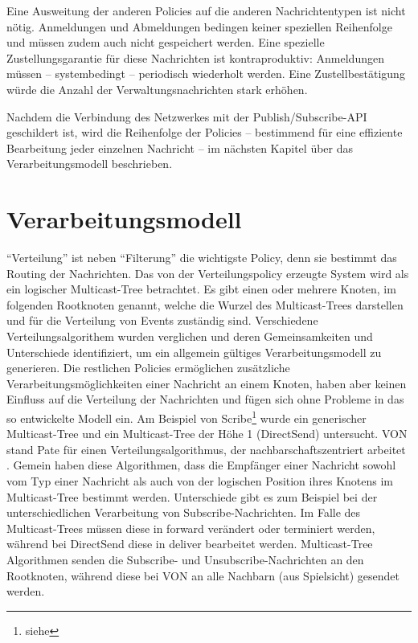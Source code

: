 Eine Ausweitung der anderen Policies auf die anderen Nachrichtentypen ist nicht nötig. Anmeldungen und Abmeldungen bedingen keiner speziellen Reihenfolge und müssen zudem auch nicht gespeichert werden. Eine spezielle Zustellungsgarantie für diese Nachrichten ist kontraproduktiv:  Anmeldungen müssen -- systembedingt -- periodisch wiederholt werden. Eine Zustellbestätigung würde die Anzahl der Verwaltungsnachrichten stark erhöhen.

Nachdem die Verbindung des Netzwerkes mit der Publish/Subscribe-API geschildert ist, wird die Reihenfolge der Policies -- bestimmend für eine effiziente Bearbeitung jeder einzelnen Nachricht -- im nächsten Kapitel über das Verarbeitungsmodell beschrieben.

\section{Verarbeitungsmodell}
``Verteilung'' ist neben ``Filterung'' die wichtigste Policy, denn sie bestimmt das Routing der Nachrichten. Das von der Verteilungspolicy erzeugte System wird als ein logischer Multicast-Tree betrachtet. Es gibt einen oder mehrere Knoten, im folgenden Rootknoten genannt, welche die Wurzel des Multicast-Trees darstellen und für die Verteilung von Events zuständig sind. Verschiedene Verteilungsalgorithem wurden verglichen und deren Gemeinsamkeiten und Unterschiede identifiziert, um ein allgemein gültiges Verarbeitungsmodell zu generieren. Die restlichen Policies ermöglichen zusätzliche Verarbeitungsmöglichkeiten einer Nachricht an einem Knoten, haben aber keinen Einfluss auf die Verteilung der Nachrichten und fügen sich ohne Probleme in das so entwickelte Modell ein. Am Beispiel von Scribe\footnote{siehe } wurde ein generischer Multicast-Tree und ein Multicast-Tree der Höhe 1 (DirectSend) untersucht. VON stand Pate für einen Verteilungsalgorithmus, der nachbarschaftszentriert arbeitet \cite{Hu2006VON}. Gemein haben diese Algorithmen, dass die Empfänger einer Nachricht sowohl vom Typ einer Nachricht als auch von der logischen Position ihres Knotens im Multicast-Tree bestimmt werden. Unterschiede gibt es zum Beispiel bei der unterschiedlichen Verarbeitung von Subscribe-Nachrichten. Im Falle des Multicast-Trees müssen diese in forward verändert oder terminiert werden, während bei DirectSend diese in deliver bearbeitet werden. Multicast-Tree Algorithmen senden die Subscribe- und Unsubscribe-Nachrichten an den Rootknoten, während diese bei VON an alle Nachbarn (aus Spielsicht) gesendet werden.

